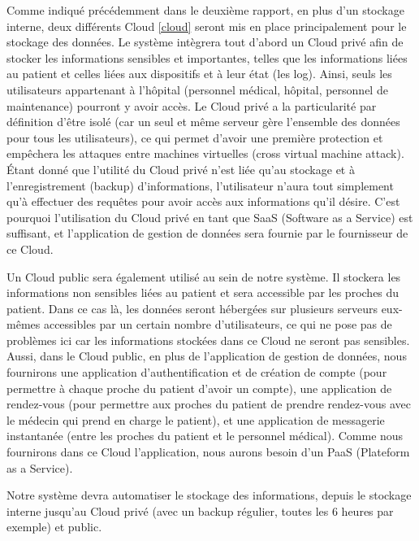 Comme indiqué précédemment dans le deuxième rapport, en plus d'un stockage interne, deux différents Cloud \ref{cloud} seront mis en place principalement pour le stockage des données. Le système intègrera tout d'abord un Cloud privé afin de stocker les informations sensibles et importantes, telles que les informations liées au patient et celles liées aux dispositifs et à leur état (les log). Ainsi, seuls les utilisateurs appartenant à l’hôpital (personnel médical, hôpital, personnel de maintenance) pourront y avoir accès. Le Cloud privé a la particularité par définition d'être isolé (car un seul et même serveur gère l’ensemble des données pour tous les utilisateurs), ce qui permet d'avoir une première protection et empêchera les attaques entre machines virtuelles (cross virtual machine attack). Étant donné que l'utilité du Cloud privé n'est liée qu'au stockage et à l'enregistrement (backup) d'informations, l'utilisateur n'aura tout simplement qu'à effectuer des requêtes pour avoir accès aux informations qu'il désire. C'est pourquoi l'utilisation du Cloud privé en tant que SaaS (Software as a Service) est suffisant, et l'application de gestion de données sera fournie par le fournisseur de ce Cloud.

Un Cloud public sera également utilisé au sein de notre système. Il stockera les informations non sensibles liées au patient et sera accessible par les proches du patient. Dans ce cas là, les données seront hébergées sur plusieurs serveurs eux-mêmes accessibles par un certain nombre d’utilisateurs, ce qui ne pose pas de problèmes ici car les informations stockées dans ce Cloud ne seront pas sensibles. Aussi, dans le Cloud public, en plus de l'application de gestion de données, nous fournirons une application d'authentification et de création de compte (pour permettre à chaque proche du patient d'avoir un compte), une application de rendez-vous (pour permettre aux proches du patient de prendre rendez-vous avec le médecin qui prend en charge le patient), et une application de messagerie instantanée (entre les proches du patient et le personnel médical). Comme nous fournirons dans ce Cloud l'application, nous aurons besoin d'un PaaS (Plateform as a Service).

Notre système devra automatiser le stockage des informations, depuis le stockage interne jusqu'au Cloud privé (avec un backup régulier, toutes les 6 heures par exemple) et public.

